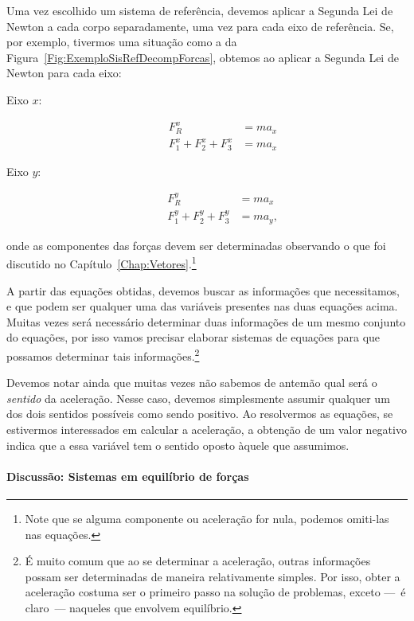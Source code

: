 Uma vez escolhido um sistema de referência, devemos aplicar a Segunda Lei de Newton a cada corpo separadamente, uma vez para cada eixo de referência. Se, por exemplo, tivermos uma situação como a da Figura~\ref{Fig:ExemploSisRefDecompForcas}, obtemos ao aplicar a Segunda Lei de Newton para cada eixo:
\begin{description}
    \item[Eixo $x$:]
        \begin{align}
            F_R^x &= ma_x \\
            F_1^x + F_2^x + F_3^x &= m a_x
        \end{align}
    \item[Eixo $y$:]
        \begin{align}
            F_R^y &= ma_x \\
            F_1^y + F_2^y + F_3^y &= m a_y,
        \end{align}            
\end{description}
%
onde as componentes das forças devem ser determinadas observando o que foi discutido no Capítulo~\ref{Chap:Vetores}.\footnote{Note que se alguma componente ou aceleração for nula, podemos omiti-las nas equações.}

A partir das equações obtidas, devemos buscar as informações que necessitamos, e que podem ser qualquer uma das variáveis presentes nas duas equações acima. Muitas vezes será necessário determinar duas informações de um mesmo conjunto do equações, por isso vamos precisar elaborar sistemas de equações para que possamos determinar tais informações.\footnote{É muito comum que ao se determinar a aceleração, outras informações possam ser determinadas de maneira relativamente simples. Por isso, obter a aceleração costuma ser o primeiro passo na solução de problemas, exceto ---~é claro~--- naqueles que envolvem equilíbrio.}

Devemos notar ainda que muitas vezes não sabemos de antemão qual será o \emph{sentido} da aceleração. Nesse caso, devemos simplesmente assumir qualquer um dos dois sentidos possíveis como sendo positivo. Ao resolvermos as equações, se estivermos interessados em calcular a aceleração, a obtenção de um valor negativo indica que a essa variável tem o sentido oposto àquele que assumimos.


\paragraph{Discussão: Sistemas em equilíbrio de forças}

